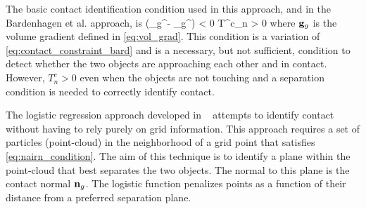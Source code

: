 The basic contact identification condition used in this approach, and in the Bardenhagen et al.
approach, is
\Beq \label{eq:nairn_condition}
  (\Bv_g^\beta - \Bv_g^\alpha)\cdot {}
    < 0 \quad \Tand \quad T^c_n > 0
\Eeq
where $\mathbf{g}_g$ is the volume gradient defined in \eqref{eq:vol_grad}.  This condition is a variation
of \eqref{eq:contact_constraint_bard} and is a necessary, but not sufficient, condition to detect
whether the two objects are approaching each other and in contact.  However, $T^c_n > 0$ even when
the objects are not touching and a separation condition is needed to correctly identify contact.

The logistic regression approach developed in ~\cite{Nairn2020} attempts to identify contact
without having to rely purely on grid information.  This approach requires a set of
particles (point-cloud) in the neighborhood of a grid point that satisfies \eqref{eq:nairn_condition}.
The aim of this technique is to identify a plane within the point-cloud that best separates
the two objects.  The normal to this plane is the contact normal $\mathbf{n}_g$.  The logistic function
penalizes points as a function of their distance from a preferred separation plane.

